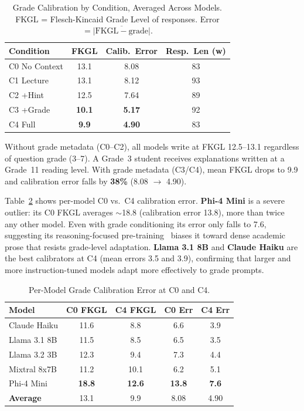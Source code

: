 \documentclass[journal]{IEEEtran}
\begin{document}
\begin{table}[h]
\centering
\caption{Grade Calibration by Condition, Averaged Across Models.
         FKGL = Flesch-Kincaid Grade Level of responses.
         Error $= \overline{|\text{FKGL} - \text{grade}|}$.}
\label{tab:calibration}
\renewcommand{\arraystretch}{1.3}
\begin{tabular}{lccc}
\toprule
\textbf{Condition} & \textbf{FKGL} & \textbf{Calib.\ Error} & \textbf{Resp.\ Len (w)} \\
\midrule
\rowcolor{lightpurple}
C0 No Context & 13.1 & 8.08 & 83 \\
C1 Lecture    & 13.1 & 8.12 & 93 \\
\rowcolor{lightpurple}
C2 +Hint      & 12.5 & 7.64 & 89 \\
C3 +Grade     & \textbf{10.1} & \textbf{5.17} & 92 \\
\rowcolor{lightpurple}
C4 Full       & \textbf{9.9}  & \textbf{4.90} & 83 \\
\bottomrule
\end{tabular}
\end{table}

Without grade metadata (C0--C2), all models write at FKGL 12.5--13.1
regardless of question grade (3--7). A Grade~3 student receives explanations
written at a Grade~11 reading level. With grade metadata (C3/C4), mean FKGL
drops to 9.9 and calibration error falls by \textbf{38\%} (8.08 $\to$ 4.90).

Table~\ref{tab:calib_model} shows per-model C0 vs.\ C4 calibration error.
\textbf{Phi-4 Mini} is a severe outlier: its C0 FKGL averages $\sim$18.8
(calibration error 13.8), more than twice any other model. Even with grade
conditioning its error only falls to 7.6, suggesting its reasoning-focused
pre-training~\cite{phi4} biases it toward dense academic prose that resists
grade-level adaptation. \textbf{Llama 3.1 8B} and \textbf{Claude Haiku} are
the best calibrators at C4 (mean errors 3.5 and 3.9), confirming that larger
and more instruction-tuned models adapt more effectively to grade prompts.

\begin{table}[h]
\centering
\caption{Per-Model Grade Calibration Error at C0 and C4.}
\label{tab:calib_model}
\renewcommand{\arraystretch}{1.25}
\begin{tabular}{lcccc}
\toprule
\textbf{Model} & \textbf{C0 FKGL} & \textbf{C4 FKGL} & \textbf{C0 Err} & \textbf{C4 Err} \\
\midrule
\rowcolor{lightpurple}
Claude Haiku  & 11.6 &  8.8 & 6.6 & 3.9 \\
Llama 3.1 8B  & 11.5 &  8.5 & 6.5 & 3.5 \\
\rowcolor{lightpurple}
Llama 3.2 3B  & 12.3 &  9.4 & 7.3 & 4.4 \\
Mixtral 8x7B  & 11.2 & 10.1 & 6.2 & 5.1 \\
\rowcolor{lightpurple}
Phi-4 Mini    & \textbf{18.8} & \textbf{12.6} & \textbf{13.8} & \textbf{7.6} \\
\midrule
\textbf{Average} & 13.1 & 9.9 & 8.08 & 4.90 \\
\bottomrule
\end{tabular}
\end{table}
\end{document}
